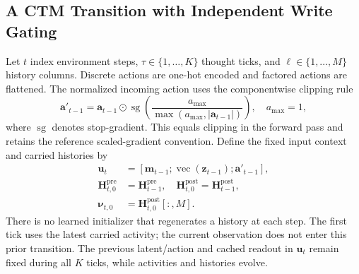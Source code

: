 \documentclass{article}
\begin{document}
\subsection{A CTM Transition with Independent Write Gating}

Let $t$ index environment steps, $\tau\in\{1,\ldots,K\}$ thought ticks, and $\ell\in\{1,\ldots,M\}$ history columns. Discrete actions are one-hot encoded and factored actions are flattened. The normalized incoming action uses the componentwise clipping rule
\begin{equation}
\mathbf a'_{t-1}=\mathbf a_{t-1}\odot
\operatorname{sg}\!\left(\frac{a_{\max}}{\max(a_{\max},|\mathbf a_{t-1}|)}\right),
\quad a_{\max}=1,
\label{eq:transition_action_clip}
\end{equation}
where $\operatorname{sg}$ denotes stop-gradient. This equals clipping in the forward pass and retains the reference scaled-gradient convention. Define the fixed input context and carried histories by
\begin{align}
\mathbf u_t&=[\mathbf m_{t-1};\operatorname{vec}(\mathbf z_{t-1});\mathbf a'_{t-1}],
\label{eq:ct_tick_input}\\
\mathbf H_{t,0}^{\mathrm{pre}}&=\mathbf H_{t-1}^{\mathrm{pre}},\quad
\mathbf H_{t,0}^{\mathrm{post}}=\mathbf H_{t-1}^{\mathrm{post}},\\
\boldsymbol\nu_{t,0}&=\mathbf H_{t,0}^{\mathrm{post}}[:,M].
\label{eq:ct_tick_initialization}
\end{align}
There is no learned initializer that regenerates a history at each step. The first tick uses the latest carried activity; the current observation does not enter this prior transition. The previous latent/action and cached readout in $\mathbf u_t$ remain fixed during all $K$ ticks, while activities and histories evolve.
\end{document}
